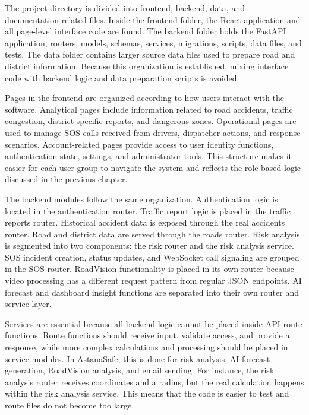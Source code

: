 ﻿\documentclass[12pt,a4paper]{report}
\begin{document}
The project directory is divided into frontend, backend, data, and documentation-related files. Inside the frontend folder, the React application and all page-level interface code are found. The backend folder holds the FastAPI application, routers, models, schemas, services, migrations, scripts, data files, and tests. The data folder contains larger source data files used to prepare road and district information. Because this organization is established, mixing interface code with backend logic and data preparation scripts is avoided.

Pages in the frontend are organized according to how users interact with the software. Analytical pages include information related to road accidents, traffic congestion, district-specific reports, and dangerous zones. Operational pages are used to manage SOS calls received from drivers, dispatcher actions, and response scenarios. Account-related pages provide access to user identity functions, authentication state, settings, and administrator tools. This structure makes it easier for each user group to navigate the system and reflects the role-based logic discussed in the previous chapter.

The backend modules follow the same organization. Authentication logic is located in the authentication router. Traffic report logic is placed in the traffic reports router. Historical accident data is exposed through the real accidents router. Road and district data are served through the roads router. Risk analysis is segmented into two components: the risk router and the risk analysis service. SOS incident creation, status updates, and WebSocket call signaling are grouped in the SOS router. RoadVision functionality is placed in its own router because video processing has a different request pattern from regular JSON endpoints. AI forecast and dashboard insight functions are separated into their own router and service layer.

Services are essential because all backend logic cannot be placed inside API route functions. Route functions should receive input, validate access, and provide a response, while more complex calculations and processing should be placed in service modules. In AstanaSafe, this is done for risk analysis, AI forecast generation, RoadVision analysis, and email sending. For instance, the risk analysis router receives coordinates and a radius, but the real calculation happens within the risk analysis service. This means that the code is easier to test and route files do not become too large.
\end{document}
